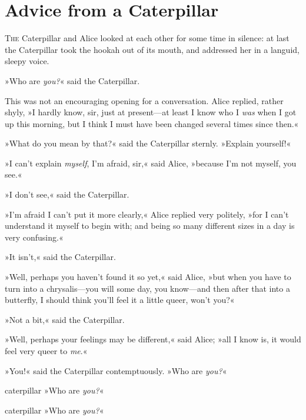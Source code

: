 \chapter{Advice from a Caterpillar}

\lettrine[lines=4,findent=2pt]{T}{he} Caterpillar and Alice looked at each other for some time in silence: at last the Caterpillar took the hookah out of its mouth, and addressed her in a languid, sleepy voice.

\zz
»Who are \textit{you?}« said the Caterpillar.

This was not an encouraging opening for a conversation. Alice replied, rather shyly, »I hardly know, sir, just at present—at least I know who I \textit{was} when I got up this morning, but I think I must have been changed several times since then.«

»What do you mean by that?« said the Caterpillar sternly. »Explain yourself!«

»I can't explain \textit{myself}, I'm afraid, sir,« said Alice, »because I'm not myself, you see.«

»I don't see,« said the Caterpillar.

»I'm afraid I can't put it more clearly,« Alice replied very politely, »for I can't understand it myself to begin with; and being so many different sizes in a day is very confusing.«

»It isn't,« said the Caterpillar.

»Well, perhaps you haven't found it so yet,« said Alice, »but when you have to turn into a chrysalis—you will some day, you know—and then after that into a butterfly, I should think you'll feel it a little queer, won't you?«

»Not a bit,« said the Caterpillar.

»Well, perhaps your feelings may be different,« said Alice; »all I know is, it would feel very queer to \textit{me}.«

»You!« said the Caterpillar contemptuously. »Who are \textit{you?}«


\begin{pictures}
	\begin{letter}
		\begin{colorbigpic}
			[1.1]
			{caterpillar}
			{»Who are \textit{you?}«}
		\end{colorbigpic}
	\end{letter}
	
	\begin{a4}
		\begin{colorbigpic}
			[1.0]
			{caterpillar}
			{»Who are \textit{you?}«}
		\end{colorbigpic}
	\end{a4}	
\end{pictures}


